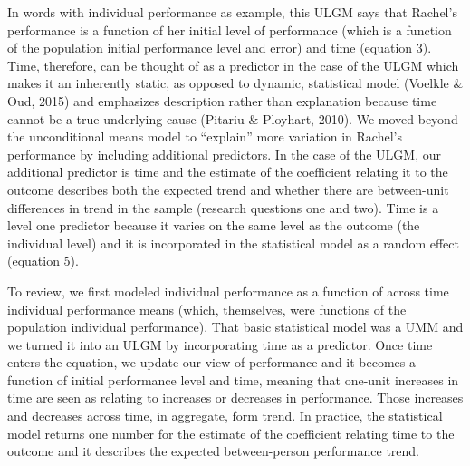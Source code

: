 \documentclass[english,,man]{apa6}
\theoremstyle{definition}
\theoremstyle{definition}
\theoremstyle{definition}
\theoremstyle{remark}
\begin{document}
In words with individual performance as example, this ULGM says that
Rachel's performance is a function of her initial level of performance
(which is a function of the population initial performance level and
error) and time (equation 3). Time, therefore, can be thought of as a
predictor in the case of the ULGM which makes it an inherently static,
as opposed to dynamic, statistical model (Voelkle \& Oud, 2015) and
emphasizes description rather than explanation because time cannot be a
true underlying cause (Pitariu \& Ployhart, 2010). We moved beyond the
unconditional means model to \enquote{explain} more variation in
Rachel's performance by including additional predictors. In the case of
the ULGM, our additional predictor is time and the estimate of the
coefficient relating it to the outcome describes both the expected trend
and whether there are between-unit differences in trend in the sample
(research questions one and two). Time is a level one predictor because
it varies on the same level as the outcome (the individual level) and it
is incorporated in the statistical model as a random effect (equation
5).

To review, we first modeled individual performance as a function of
across time individual performance means (which, themselves, were
functions of the population individual performance). That basic
statistical model was a UMM and we turned it into an ULGM by
incorporating time as a predictor. Once time enters the equation, we
update our view of performance and it becomes a function of initial
performance level and time, meaning that one-unit increases in time are
seen as relating to increases or decreases in performance. Those
increases and decreases across time, in aggregate, form trend. In
practice, the statistical model returns one number for the estimate of
the coefficient relating time to the outcome and it describes the
expected between-person performance trend.
\end{document}
